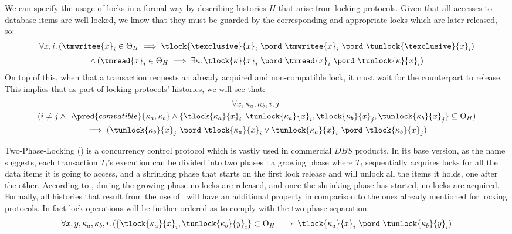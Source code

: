 We can specify the usage of locks in a formal way by describing histories $H$ that arise from locking protocols. Given that all accesses to database items are well locked, we know that they must be guarded by the corresponding and appropriate locks which are later released, so:
\begin{gather*}
	\forall x, i \ldotp \left( \tmwritee{x}_i \in \Theta_H \implies \tlock{\texclusive}{x}_i\ \pord\ \tmwritee{x}_i\ \pord\ \tunlock{\texclusive}{x}_i \right) \\[0.3em]
	\land \left( \tmread{x}_i \in \Theta_H \implies \exists \kappa \ldotp \tlock{\kappa}{x}_i\ \pord\ \tmread{x}_i\ \pord\ \tunlock{\kappa}{x}_i \right)
\end{gather*}
On top of this, when that a transaction requests an already acquired and non-compatible lock, it must wait for the counterpart to release. This implies that as part of locking protocols' histories, we will see that:
\begin{gather*}
	\forall x, \kappa_a, \kappa_b, i, j \ldotp \\
	(i \neq j \land \lnot \pred{compatible}{\kappa_a, \kappa_b} \land \{ \tlock{\kappa_a}{x}_i, \tunlock{\kappa_a}{x}_i, \tlock{\kappa_b}{x}_j, \tunlock{\kappa_b}{x}_j \}\subseteq \Theta_H) \\
	 \implies (\tunlock{\kappa_b}{x}_j\ \pord\ \tlock{\kappa_a}{x}_i \lor \tunlock{\kappa_a}{x}_i\ \pord\ \tlock{\kappa_b}{x}_j)
\end{gather*}

Two-Phase-Locking (\tpl) is a concurrency control protocol which is vastly used in commercial $DBS$ products. In its base version, as the name suggests, each transaction $T_i$'s execution can be divided into two phases \cite{ccontrol}: a growing phase where $T_i$ sequentially acquires locks for all the data items it is going to access, and a shrinking phase that starts on the first lock release and will unlock all the items it holds, one after the other. According to \tpl, during the growing phase no locks are released, and once the shrinking phase has started, no locks are acquired. Formally, all histories that result from the use of \tpl\ will have an additional property in comparison to the ones already mentioned for locking protocols. In fact lock operations will be further ordered as to comply with the two phase separation:
\[
	\forall x, y, \kappa_a, \kappa_b, i \ldotp (\{ \tlock{\kappa_a}{x}_i, \tunlock{\kappa_b}{y}_i \} \subset \Theta_H \implies \tlock{\kappa_a}{x}_i\ \pord\ \tunlock{\kappa_b}{y}_i)
\]

